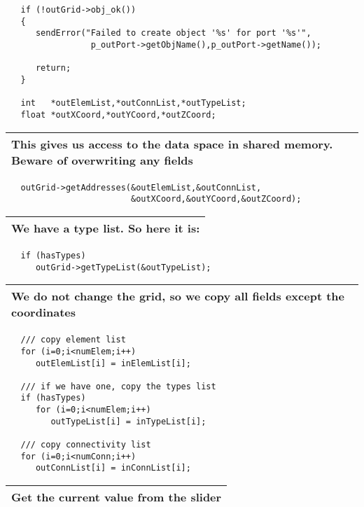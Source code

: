 \begin{verbatim}       
   if (!outGrid->obj_ok())
   {
      sendError("Failed to create object '%s' for port '%s'",
                 p_outPort->getObjName(),p_outPort->getName());
  
      return;
   }
   
   int   *outElemList,*outConnList,*outTypeList;
   float *outXCoord,*outYCoord,*outZCoord;
\end{verbatim} 

\begin{longtable}{|p{12cm}|}
\hline
   {\bf This gives us access to the data space in shared memory. Beware of
   overwriting any fields} \\
\hline
\end{longtable}

\begin{verbatim}
   outGrid->getAddresses(&outElemList,&outConnList,
                         &outXCoord,&outYCoord,&outZCoord);
\end{verbatim}

\begin{longtable}{|l|}
\hline
   {\bf We have a type list. So here it is:} \\
\hline
\end{longtable}

\begin{verbatim}    
   if (hasTypes)
      outGrid->getTypeList(&outTypeList);                                        
\end{verbatim}

\begin{longtable}{|p{12cm}|}
\hline
   {\bf We do not change the grid, so we copy all fields except the coordinates} \\
\hline
\end{longtable}

\begin{verbatim}      
   /// copy element list
   for (i=0;i<numElem;i++)
      outElemList[i] = inElemList[i];
   
   /// if we have one, copy the types list
   if (hasTypes)
      for (i=0;i<numElem;i++)
         outTypeList[i] = inTypeList[i];
 
   /// copy connectivity list
   for (i=0;i<numConn;i++)
      outConnList[i] = inConnList[i];
\end{verbatim}

\begin{longtable}{|l|}
\hline
   {\bf Get the current value from the slider} \\
\hline
\end{longtable}

